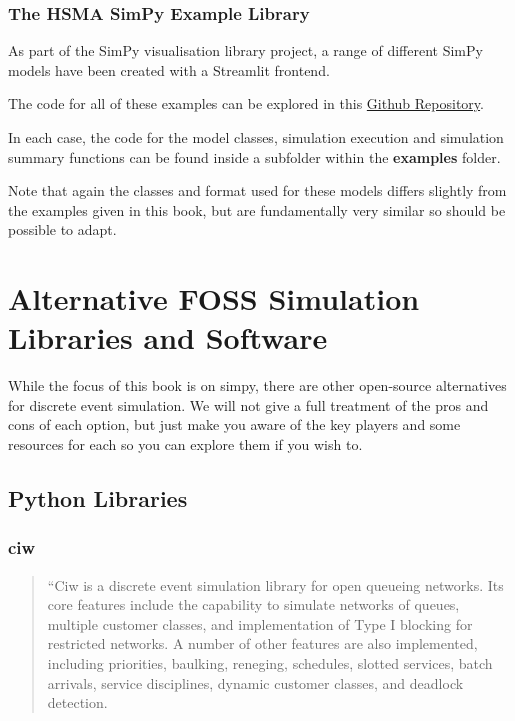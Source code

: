 \documentclass[
  letterpaper,
  DIV=11,
  numbers=noendperiod]{scrreprt}
\begin{document}
\subsection{The HSMA SimPy Example
Library}\label{the-hsma-simpy-example-library}

As part of the SimPy visualisation library project, a range of different
SimPy models have been created with a Streamlit frontend.

The code for all of these examples can be explored in this
\href{https://github.com/Bergam0t/simpy_visualisation}{Github
Repository}.

In each case, the code for the model classes, simulation execution and
simulation summary functions can be found inside a subfolder within the
\textbf{examples} folder.

Note that again the classes and format used for these models differs
slightly from the examples given in this book, but are fundamentally
very similar so should be possible to adapt.


\chapter{Alternative FOSS Simulation Libraries and
Software}\label{alternative-foss-simulation-libraries-and-software}

While the focus of this book is on simpy, there are other open-source
alternatives for discrete event simulation. We will not give a full
treatment of the pros and cons of each option, but just make you aware
of the key players and some resources for each so you can explore them
if you wish to.

\section{Python Libraries}\label{python-libraries}

\subsection{ciw}\label{ciw}

\begin{quote}
``Ciw is a discrete event simulation library for open queueing networks.
Its core features include the capability to simulate networks of queues,
multiple customer classes, and implementation of Type I blocking for
restricted networks. A number of other features are also implemented,
including priorities, baulking, reneging, schedules, slotted services,
batch arrivals, service disciplines, dynamic customer classes, and
deadlock detection.
\end{quote}
\end{document}

